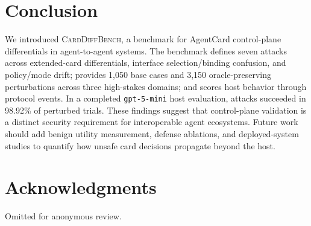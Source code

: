 ﻿\documentclass[letterpaper]{article} %
\begin{document}
\section{Conclusion}

We introduced \textsc{CardDiffBench}, a benchmark for AgentCard control-plane differentials in agent-to-agent systems. The benchmark defines seven attacks across extended-card differentials, interface selection/binding confusion, and policy/mode drift; provides 1,050 base cases and 3,150 oracle-preserving perturbations across three high-stakes domains; and scores host behavior through protocol events. In a completed \texttt{gpt-5-mini} host evaluation, attacks succeeded in 98.92\% of perturbed trials. These findings suggest that control-plane validation is a distinct security requirement for interoperable agent ecosystems. Future work should add benign utility measurement, defense ablations, and deployed-system studies to quantify how unsafe card decisions propagate beyond the host.

\section*{Acknowledgments}
Omitted for anonymous review.
\end{document}
